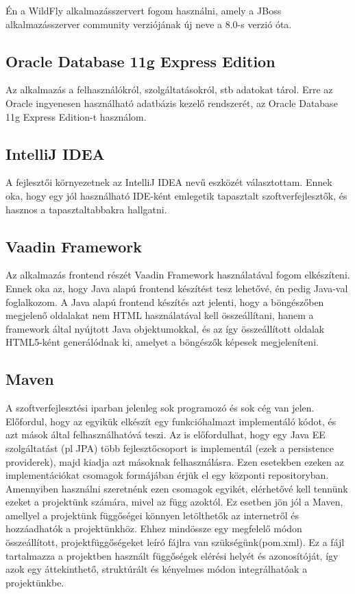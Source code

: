 \documentclass[centeredchapter]{thesis-ekf}
\theoremstyle{definition}
\theoremstyle{remark}
\begin{document}
Én a WildFly alkalmazásszervert fogom használni, amely a JBoss alkalmazásszerver community verziójának új neve a 8.0-s verzió óta. 

\subsection{Oracle Database 11g Express Edition}

Az alkalmazás a felhasználókról, szolgáltatásokról, stb adatokat tárol. Erre az Oracle ingyenesen használható adatbázis kezelő rendszerét, az Oracle Database 11g Express Edition-t használom.
\subsection{IntelliJ IDEA}

A fejlesztői környezetnek az IntelliJ IDEA nevű eszközét választottam. Ennek oka, hogy egy jól használható IDE-ként emlegetik tapasztalt szoftverfejlesztők, és hasznos a tapasztaltabbakra hallgatni. 

\subsection{Vaadin Framework}

Az alkalmazás frontend részét Vaadin Framework használatával fogom elkészíteni. Ennek oka az, hogy Java alapú frontend készítést tesz lehetővé, én pedig Java-val foglalkozom. A Java alapú frontend készítés azt jelenti, hogy a böngészőben megjelenő oldalakat nem HTML használatával kell összeállítani, hanem a framework által nyújtott Java objektumokkal, és az így összeállított oldalak HTML5-ként generálódnak ki, amelyet a böngészők képesek megjeleníteni.

\subsection{Maven}

A szoftverfejlesztési iparban jelenleg sok programozó és sok cég van jelen. Előfordul, hogy az egyikük elkészít egy funkcióhalmazt implementáló kódot, és azt mások által felhasználhatóvá teszi.
Az is előfordulhat, hogy egy Java EE szolgáltatást (pl JPA) több fejlesztőcsoport is implementál (ezek a persistence providerek), majd kiadja azt másoknak felhasználásra. Ezen esetekben ezeken az implementációkat csomagok formájában érjük el egy központi repositoryban. Amennyiben használni szeretnénk ezen csomagok egyikét, elérhetővé kell tennünk ezeket a projektünk számára, mivel az függ azoktól. Ez esetben jön jól a Maven, amellyel a projektünk függőségei könnyen letölthetők az internetről és hozzáadhatók a projektünkhöz. Ehhez mindössze egy megfelelő módon összeállított, projektfüggőségeket leíró fájlra van szükségünk(pom.xml). Ez a fájl tartalmazza a projektben használt függőségek elérési helyét és azonosítóját, így azok egy áttekinthető, struktúrált és kényelmes módon integrálhatóak a projektünkbe.
\end{document}

